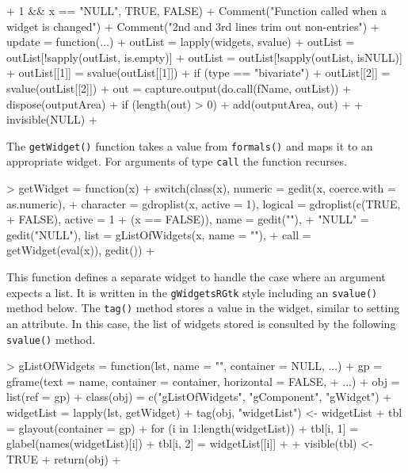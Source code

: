 \documentclass[12pt]{article}
\newcommand{\RCode}[1]{\texttt{#1}}
\newcommand{\RFunc}[1]{\texttt{#1()}}
\begin{document}
\begin{Schunk}
\begin{Sinput}
{+         1 && x == "NULL", TRUE, FALSE)
+     Comment("Function called when a widget is changed")
+     Comment("2nd and 3rd lines trim out non-entries")
+     update = function(...) {
+         outList = lapply(widgets, svalue)
+         outList = outList[!sapply(outList, is.empty)]
+         outList = outList[!sapply(outList, isNULL)]
+         outList[[1]] = svalue(outList[[1]])
+         if (type == "bivariate") 
+             outList[[2]] = svalue(outList[[2]])
+         out = capture.output(do.call(fName, outList))
+         dispose(outputArea)
+         if (length(out) > 0) 
+             add(outputArea, out)
+     }
+     invisible(NULL)
+ }
\end{Sinput}
\end{Schunk}

The \RFunc{getWidget} function takes a value from \RFunc{formals}
and maps it to an appropriate widget. For arguments of type
\RCode{call} the function recurses.

\begin{Schunk}
\begin{Sinput}
> getWidget = function(x) {
+     switch(class(x), numeric = gedit(x, coerce.with = as.numeric), 
+         character = gdroplist(x, active = 1), logical = gdroplist(c(TRUE, 
+             FALSE), active = 1 + (x == FALSE)), name = gedit(""), 
+         "NULL" = gedit("NULL"), list = gListOfWidgets(x, name = ""), 
+         call = getWidget(eval(x)), gedit())
+ }
\end{Sinput}
\end{Schunk}

This function defines a separate widget to handle the case where an
argument expects a list. It is written in the \RCode{gWidgetsRGtk} style
including an \RFunc{svalue} method below. The \RFunc{tag} method stores
a value in the widget, similar to setting an attribute. In this case,
the list of widgets stored is consulted by the following \RFunc{svalue} method.

\begin{Schunk}
\begin{Sinput}
> gListOfWidgets = function(lst, name = "", container = NULL, ...) {
+     gp = gframe(text = name, container = container, horizontal = FALSE, 
+         ...)
+     obj = list(ref = gp)
+     class(obj) = c("gListOfWidgets", "gComponent", "gWidget")
+     widgetList = lapply(lst, getWidget)
+     tag(obj, "widgetList") <- widgetList
+     tbl = glayout(container = gp)
+     for (i in 1:length(widgetList)) {
+         tbl[i, 1] = glabel(names(widgetList)[i])
+         tbl[i, 2] = widgetList[[i]]
+     }
+     visible(tbl) <- TRUE
+     return(obj)
+ }
\end{Sinput}
\end{Schunk}
\end{document}
